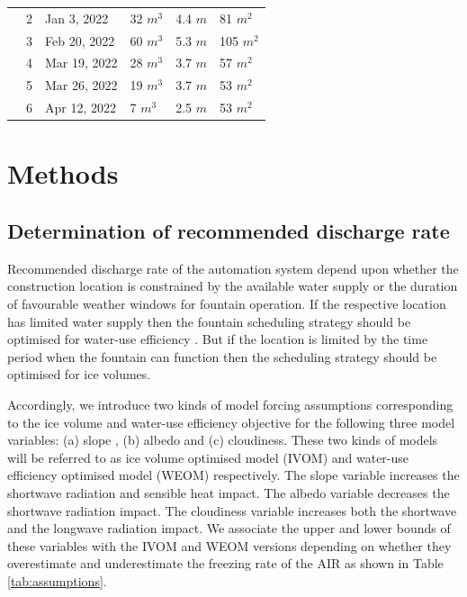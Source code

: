 \documentclass[tc, manuscript]{copernicus}
\begin{document}
\begin{table}
\begin{tabular}{@{}|llllll|@{}}
		\multicolumn{1}{|l|}{} & 2            & Jan 3, 2022   & 32 $m^{3}$      & 4.4 $m$
		                       & 81 $m^{2}$                                                                       \\
		\multicolumn{1}{|l|}{} & 3            & Feb 20, 2022   & 60 $m^{3}$      & 5.3 $m$
		                       & 105 $m^{2}$                                                                       \\
		\multicolumn{1}{|l|}{} & 4            & Mar 19, 2022   & 28 $m^{3}$      & 3.7 $m$
		                       & 57 $m^{2}$                                                                       \\
		\multicolumn{1}{|l|}{} & 5            & Mar 26, 2022   & 19 $m^{3}$      & 3.7 $m$
		                       & 53 $m^{2}$                                                                       \\
		\multicolumn{1}{|l|}{} & 6            & Apr 12, 2022   & 7 $m^{3}$      & 2.5 $m$
		                       & 53 $m^{2}$                                                                       \\
		\bottomrule
	\end{tabular}

\end{table}

\section{Methods}

\subsection{Determination of recommended discharge rate}

Recommended discharge rate of the automation system depend upon whether the construction location is 
constrained by the available water supply or the duration of favourable weather windows for fountain operation.
If the respective location has limited water supply then the fountain scheduling strategy should be optimised
for water-use efficiency . But if the location is limited by the time period when the fountain can function then
the scheduling strategy should be optimised for ice volumes.

Accordingly, we introduce two kinds of model forcing assumptions corresponding to the ice volume and water-use
efficiency objective for the following three model variables: (a) slope , (b) albedo and (c) cloudiness. These
two kinds of models will be referred to as ice volume optimised model (IVOM) and water-use efficiency optimised
model (WEOM) respectively. The slope variable increases the shortwave radiation and sensible heat impact. The
albedo variable decreases the shortwave radiation impact. The cloudiness variable increases both the shortwave
and the longwave radiation impact. We associate the upper and lower bounds of these variables with the IVOM and
WEOM versions depending on whether they overestimate and underestimate the freezing rate of the AIR as shown in
Table \ref{tab:assumptions}. 
\end{document}
